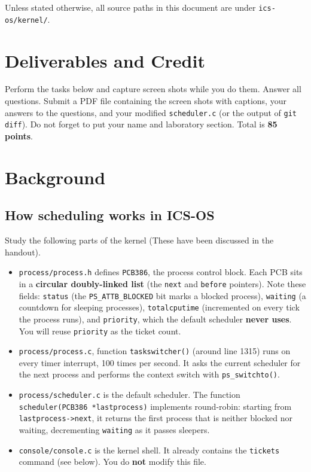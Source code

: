 \documentclass[a4paper, 11pt,oneside]{article}
\begin{document}
Unless stated otherwise, all source paths in this document are under \texttt{ics-os/kernel/}.

\section{Deliverables and Credit}
Perform the tasks below and capture screen shots while you do them. Answer all questions. Submit a PDF file containing the screen shots with captions, your answers to the questions, and your modified \texttt{scheduler.c} (or the output of \texttt{git diff}). Do not forget to put your name and laboratory section. Total is \textbf{85 points}.

\section{Background}

\subsection*{How scheduling works in ICS-OS}
Study the following parts of the kernel (These have been discussed in the handout).

\begin{itemize}[itemsep=0pt,parsep=0pt]
  \item \texttt{process/process.h} defines \texttt{PCB386}, the process control block. Each PCB sits in a \textbf{circular doubly-linked list} (the \texttt{next} and \texttt{before} pointers). Note these fields: \texttt{status} (the \texttt{PS\_ATTB\_BLOCKED} bit marks a blocked process), \texttt{waiting} (a countdown for sleeping processes), \texttt{totalcputime} (incremented on every tick the process runs), and \texttt{priority}, which the default scheduler \textbf{never uses}. You will reuse \texttt{priority} as the ticket count.
  \item \texttt{process/process.c}, function \texttt{taskswitcher()} (around line 1315) runs on every timer interrupt, 100 times per second. It asks the current scheduler for the next process and performs the context switch with \texttt{ps\_switchto()}.
  \item \texttt{process/scheduler.c} is the default scheduler. The function \texttt{scheduler(PCB386 *lastprocess)} implements round-robin: starting from \texttt{lastprocess->next}, it returns the first process that is neither blocked nor waiting, decrementing \texttt{waiting} as it passes sleepers.
  \item \texttt{console/console.c} is the kernel shell. It already contains the \texttt{tickets} command (see below). You do \textbf{not} modify this file.
\end{itemize}
\end{document}

